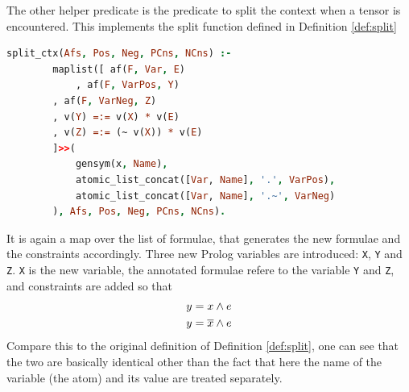 \documentclass[a4paper, 12pt, tesi, english]{report}
\begin{document}
The other helper predicate is the predicate to split the context when a tensor is encountered.
This implements the split function defined in Definition \ref{def:split}
\begin{lstlisting}[language=prolog]
%! split_ctx(+[AFs], -[AFs], -[AFs], -[Cns], -[Cns]) is det.
split_ctx(Afs, Pos, Neg, PCns, NCns) :-
    	maplist([ af(F, Var, E)
	        , af(F, VarPos, Y)
		, af(F, VarNeg, Z)
		, v(Y) =:= v(X) * v(E)
		, v(Z) =:= (~ v(X)) * v(E)
		]>>(
        	gensym(x, Name),
        	atomic_list_concat([Var, Name], '.', VarPos),
        	atomic_list_concat([Var, Name], '.~', VarNeg)
    	), Afs, Pos, Neg, PCns, NCns).
\end{lstlisting}
It is again a map over the list of formulae, that generates the new formulae and the constraints accordingly.
Three new Prolog variables are introduced: \texttt{X}, \texttt{Y} and \texttt{Z}.
\texttt{X} is the new variable, the annotated formulae refere to the variable \texttt{Y} and \texttt{Z}, and constraints are added so that
\begin{align*}
	y &= x \wedge e \\
	y &= \overline{x} \wedge e \\
\end{align*}
Compare this to the original definition of Definition \ref{def:split}, one can see that the two are basically identical other than the fact that here the name of the variable (the atom) and its value are treated separately.
\end{document}
